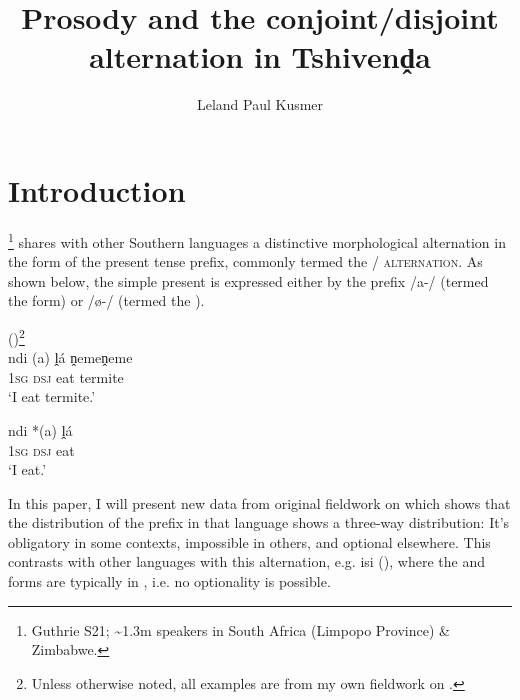 \documentclass[output=paper,modfonts,nonflat,hidelinks]{langsci/langscibook}
\title{Prosody and the conjoint\slash disjoint alternation in {T}shivenḓa}
\author{Leland Paul Kusmer\affiliation{University of Massachusetts at Amherst}}
\begin{document}
\maketitle 

\section{Introduction}\label{sec:kusmer:intro}

\footnote{Guthrie S21; \textasciitilde 1.3m speakers in South
Africa (Limpopo Province) \& Zimbabwe.} shares with other Southern 
	languages a distinctive morphological alternation in the form of the
	present tense prefix, commonly termed the \textsc{\slash {}
	alternation}. As shown below, the simple present is expressed either by the
	prefix /a-/ (termed the  form) or /\o-/ (termed the ).

 

\ea {} ()\label{ex:kusmer:intro_disj}\footnote{Unless otherwise noted, all
examples are from my own fieldwork on .}\\

	\ea\gll ndi (a) ḽá ṋemeṋeme\\
		 1\textsc{sg} \textsc{dsj} eat termite\\
		\glt `I eat termite.'
	
  
	\ex\gll ndi *(a) ḽá\\
		 1\textsc{sg} \textsc{dsj} eat\\
		 \glt`I eat.'
	\z

\z
  


In this paper, I will present new data from original fieldwork on 
which shows that the distribution of the  prefix in that language shows
a three-way distribution: It's obligatory in some contexts, impossible in
others, and optional elsewhere. This contrasts with other languages with this
alternation, e.g. isi (\citealt{Halpert2015}), where the  and
 forms are typically in , i.e. no optionality
is possible. 
\end{document}
